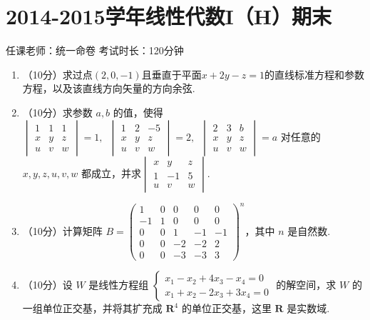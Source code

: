 \section{2014-2015学年线性代数I（H）期末}

\begin{center}
    任课老师：统一命卷\hspace{4em} 考试时长：120分钟
\end{center}

\begin{enumerate}
    \item （10分）求过点$(2,0,-1)$且垂直于平面$x+2y-z=1$的直线标准方程和参数方程，以及该直线方向矢量的方向余弦.

    \item （10分）求参数 $a, b$  的值，使得 $\begin{vmatrix}1 & 1 & 1 \\ x & y & z \\u & v & w\end{vmatrix}=1,\enspace \begin{vmatrix}1 & 2 & -5 \\ x & y & z \\u & v & w\end{vmatrix}=2,\enspace \begin{vmatrix}2 & 3 & b \\ x & y & z \\u & v & w\end{vmatrix}=a$ 对任意的 $x,y,z,u,v,w$ 都成立，并求$\begin{vmatrix}x & y & z \\ 1 & -1 & 5 \\u & v & w\end{vmatrix}$.

    \item （10分）计算矩阵 $B=\begin{pmatrix}1 & 0 & 0 & 0 & 0 \\ -1 & 1 & 0 & 0 & 0 \\ 0 & 0 & 1 & -1 & -1 \\ 0 & 0 & -2 & -2 & 2 \\ 0 & 0 & -3 & -3 & 3\end{pmatrix}^n$，其中 $n$ 是自然数.

    \item （10分）设 $W$ 是线性方程组 $\begin{cases}
        x_1-x_2+4x_3-x_4=0 \\ x_1+x_2-2x_3+3x_4=0
    \end{cases}$ 的解空间，求 $W$ 的一组单位正交基，并将其扩充成 $\mathbf{R}^4$ 的单位正交基，这里 $\mathbf{R}$ 是实数域.


\end{enumerate}
